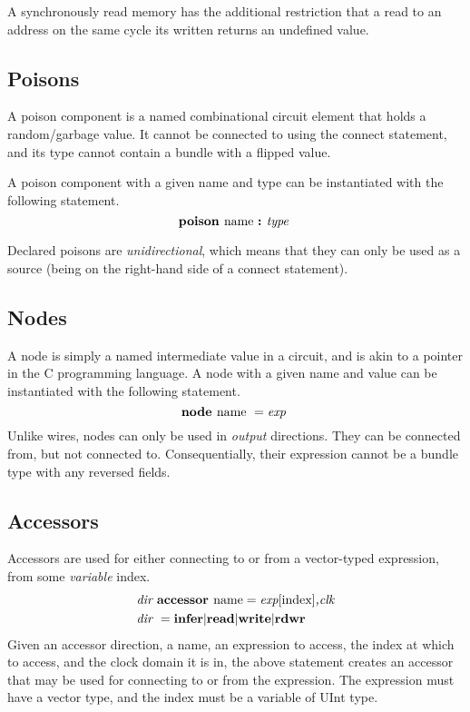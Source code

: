 \documentclass[12pt]{article}
\begin{document}
A synchronously read memory has the additional restriction that a read to an address on the same cycle its written returns an undefined value.

\subsection{Poisons}
A poison component is a named combinational circuit element that holds a random/garbage value.
It cannot be connected to using the connect statement, and its type cannot contain a bundle with a flipped value.

A poison component with a given name and type can be instantiated with the following statement.
\[
\text{\bf poison\ } \text{name } \text{\bf :\ } \text{\em type\ } \\
\]

Declared poisons are {\em unidirectional}, which means that they can only be used as a source (being on the right-hand side of a connect statement).

\subsection{Nodes}
A node is simply a named intermediate value in a circuit, and is akin to a pointer in the C programming language.
A node with a given name and value can be instantiated with the following statement.
\[
\text{\bf node\ } \text{name } = \text{\em exp\ } \\
\]
Unlike wires, nodes can only be used in {\em output} directions.
They can be connected from, but not connected to.
Consequentially, their expression cannot be a bundle type with any reversed fields.

\subsection{Accessors}
Accessors are used for either connecting to or from a vector-typed expression, from some {\em variable} index.
\[
\begin{aligned}
&\text{\em dir\ } \text{\bf accessor\ } \text{name} = \text{\em exp}[\text{index}] \text{\em ,clk} \\
&\text{\em dir\ }        =     \text{\bf infer} \vert \text{\bf read} \vert \text{\bf write} \vert \text{\bf rdwr\ } \\
\end{aligned}
\]
Given an accessor direction, a name, an expression to access, the index at which to access, and the clock domain it is in, the above statement creates an accessor that may be used for connecting to or from the expression.
The expression must have a vector type, and the index must be a variable of UInt type.
\end{document}
